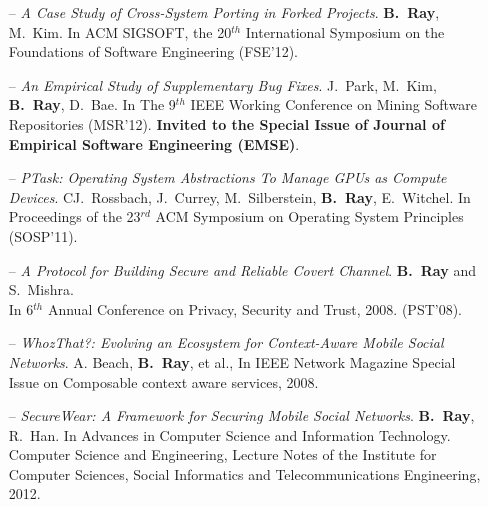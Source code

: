 \documentclass[overlapped,line,letterpaper, 12pt]{res}
\begin{document}
\begin{resume}
\begin{itemize}
\item[--]
{\em A Case Study of Cross-System Porting in Forked Projects}. 
{\bf B.~Ray}, M.~Kim.
{\small In ACM SIGSOFT, the 20$^{th}$ International Symposium on the Foundations of Software Engineering
(FSE'12).}

\item[--]
{\em An Empirical Study of Supplementary Bug Fixes}. 
J.~Park, M.~Kim, {\bf B.~Ray}, D.~Bae. 
{\small In The 9$^{th}$ IEEE Working Conference on Mining Software Repositories (MSR'12).}
\textbf{\small{Invited to the Special Issue of Journal of Empirical Software Engineering (EMSE)}}.

\item[--]
{\em PTask: Operating System Abstractions To Manage GPUs as Compute Devices}.
CJ.~Rossbach, J.~Currey, M.~Silberstein, {\bf B.~Ray}, E.~Witchel. 
{\small In Proceedings of the 23$^{rd}$ ACM Symposium on Operating System Principles (SOSP'11)}. 


\item[--]
{\em A Protocol for Building Secure and Reliable Covert Channel}. 
{\bf B.~Ray} and S.~Mishra. \\
{\small In 6$^{th}$ Annual Conference on Privacy, Security and Trust, 2008. (PST'08).}

\item[--]
{\em WhozThat?: Evolving an Ecosystem for Context-Aware Mobile Social Networks}.
A. Beach, {\bf B.~Ray}, et al., {\small In IEEE Network Magazine Special Issue on Composable context aware services, 
2008.}

\item[--]
{\em SecureWear: A Framework for Securing Mobile Social Networks}.
{\bf B.~Ray},  R.~Han. 
{\small In Advances in Computer Science and Information Technology. Computer Science and Engineering, Lecture Notes of the Institute for Computer Sciences, Social Informatics and Telecommunications Engineering, 2012.}
\end{itemize}


\end{resume}
\end{document}
